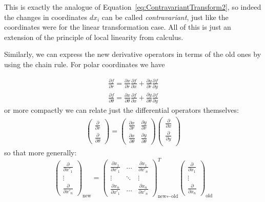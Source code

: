 \documentclass[../master.tex]{subfiles}
\begin{document}
	This is exactly the analogue of Equation~\eqref{eq:ContravariantTransform2}, so indeed the changes in coordinates $dx_i$ can be called \emph{contravariant}, just like the coordinates were for the linear transformation case. All of this is just an extension of the principle of local linearity from calculus.
	
	Similarly, we can express the new derivative operators in terms of the old ones by using the chain rule. For polar coordinates we have
	
	\begin{align*}
		\frac{\partial f}{\partial r} = \frac{\partial x}{\partial r}\frac{\partial f}{\partial x}  +  \frac{\partial y}{\partial r} \frac{\partial f}{\partial y} \\
		\frac{\partial f}{\partial \theta} = \frac{\partial x}{\partial \theta}\frac{\partial f}{\partial x}  + \frac{\partial y}{\partial \theta}\frac{\partial f}{\partial y}
	\end{align*}
	or more compactly we can relate just the differential operators themselves: 
	\begin{align*}
		\begin{pmatrix}
			\frac{\partial}{\partial r} \\ \frac{\partial}{\partial \theta}
		\end{pmatrix}
		 = 
		 \begin{pmatrix}
		 	\frac{\partial x}{\partial r} & \frac{\partial y}{\partial r} \\
			\frac{\partial x}{\partial \theta} & \frac{\partial y}{\partial \theta}
		 \end{pmatrix}
		 \begin{pmatrix}
		 	\frac{\partial}{\partial x} \\ \frac{\partial}{\partial y} \\
		 \end{pmatrix}
	\end{align*}
	so that more generally: 
	\begin{equation}\label{eq:partial_transform}
		\begin{pmatrix}
			\frac{\partial}{\partial x'_1} \\ \vdots \\ \frac{\partial}{\partial x'_n} 
		\end{pmatrix}_{\text{new}}
		=
	 \begin{pmatrix}
	 	\frac{\partial x_1}{\partial x'_1} & \dots & \frac{\partial x_1}{\partial x'_n} \\
		\vdots & \ddots & \vdots \\
		\frac{\partial x_n}{\partial x'_1} & \dots & \frac{\partial x_n}{\partial x'_n}
	 \end{pmatrix}_{\text{new} \leftarrow \text{old}}^T
	 \begin{pmatrix}
	 	\frac{\partial}{\partial x_1} \\	\vdots \\ \frac{\partial}{\partial x_n}
	 \end{pmatrix}_{\text{old}}
	\end{equation}
\end{document}
